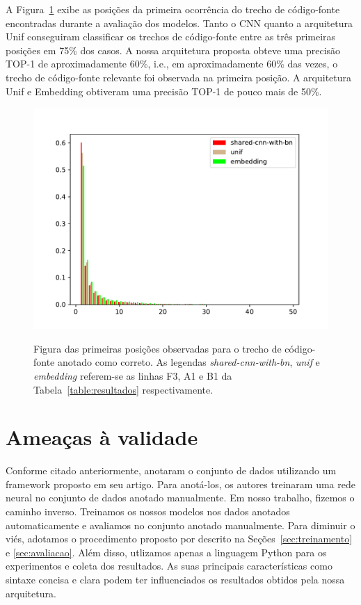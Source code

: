 A Figura~\ref{fig:histogram-mrr} exibe as posições da primeira ocorrência do trecho de código-fonte encontradas durante a avaliação dos modelos. Tanto o CNN quanto a arquitetura Unif conseguiram classificar os trechos de código-fonte entre as três primeiras posições em 75\% dos casos. A nossa arquitetura proposta obteve uma precisão TOP-1 de aproximadamente 60\%, i.e., em aproximadamente 60\% das vezes, o trecho de código-fonte relevante foi observada na primeira posição. A arquitetura Unif e Embedding obtiveram uma precisão TOP-1 de pouco mais de 50\%. 


\begin{figure}[h]
    \centering
    \caption[Figura das primeiras posições observadas para o trecho de código-fonte anotado como correto.]{Figura das primeiras posições observadas para o trecho de código-fonte anotado como correto. As legendas \emph{shared-cnn-with-bn}, \emph{unif} e \emph{embedding} referem-se as linhas F3, A1 e B1 da Tabela~\ref{table:resultados} respectivamente. }
    \includegraphics[width=1\textwidth]{figuras/cap-resultados/histogram.pdf}
    \label{fig:histogram-mrr}
\end{figure}

\section{Ameaças à validade}

Conforme citado anteriormente,  anotaram o conjunto de dados utilizando um framework proposto em seu artigo. Para anotá-los, os autores treinaram uma rede neural no conjunto de dados anotado manualmente. Em nosso trabalho, fizemos o caminho inverso. Treinamos os nossos modelos nos dados anotados automaticamente e avaliamos no conjunto anotado manualmente. Para diminuir o viés, adotamos o procedimento proposto por  descrito na Seções~\ref{sec:treinamento} e \ref{sec:avaliacao}.
Além disso, utlizamos apenas a linguagem Python para os experimentos e coleta dos resultados. As suas principais características como sintaxe concisa e clara podem ter influenciados os resultados obtidos pela nossa arquitetura. 

